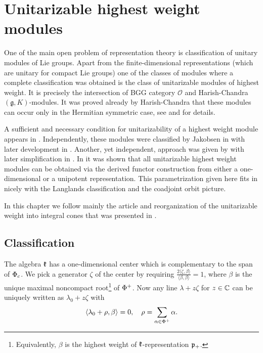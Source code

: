 \chapter{Unitarizable highest weight modules}\label{ch:unitarizable}

One of the main open problem of representation theory is classification of unitary modules of Lie groups. Apart from the finite-dimensional representations (which are unitary for compact Lie groups) one of the classes of modules where a complete classification was obtained is the class of unitarizable modules of highest weight. It is precisely the intersection of BGG category $\mathcal{O}$ and Harish-Chandra $(\mathfrak{g}, K)$-modules. It was proved already by Harish-Chandra that these modules can occur only in the Hermitian symmetric case, see \cite{harish-chandra_representations_1955, harish-chandra_representations_1956-1} and \cite{harish-chandra_representations_1956} for details.

A sufficient and necessary condition for unitarizability of a highest weight module appears in \cite{garland_unitarizable_1981}. Independently, these modules were classified by Jakobsen in \cite{jakobsen_last_1981, jakobsen_hermitian_1983} with later development in \cite{jakobsen_intrinsic_1996}. Another, yet independent, approach was given by \cite{enright_classification_1983} with later simplification in \cite{joseph_annihilators_1992}. In \cite{adams_unitary_1987} it was shown that all unitarizable highest weight modules can be obtained via the derived functor construction from either a one-dimensional or a unipotent representation. This  parametrization given here fits in nicely with the Langlands classification and the coadjoint orbit picture.  

In this chapter we follow mainly the article \cite{enright_classification_1983} and reorganization of the unitarizable weight into integral cones that was presented in \cite{davidson_differential_1991}. 

\section{Classification}

The algebra $\mathfrak{k}$ has a one-dimensional center which is complementary to the span of $\Phi_c$. We pick a generator $\zeta$ of the center by requiring $\frac{2 \langle \zeta,\beta \rangle}{\langle \beta, \beta \rangle} = 1$, where $\beta$ is the unique maximal noncompact root\footnote{Equivalently, $\beta$ is the highest weight of $\mathfrak{k}$-representation $\mathfrak{p}_+$.} of $\Phi^+$. Now any line $\lambda+z\zeta$ for $z\in\mathbb{C}$ can be uniquely written as $\lambda_0 + z\zeta$ with
\[
 \langle \lambda_0 + \rho,\beta \rangle = 0, \quad \rho =\sum_{\alpha\in\Phi^+} \alpha.
\]

